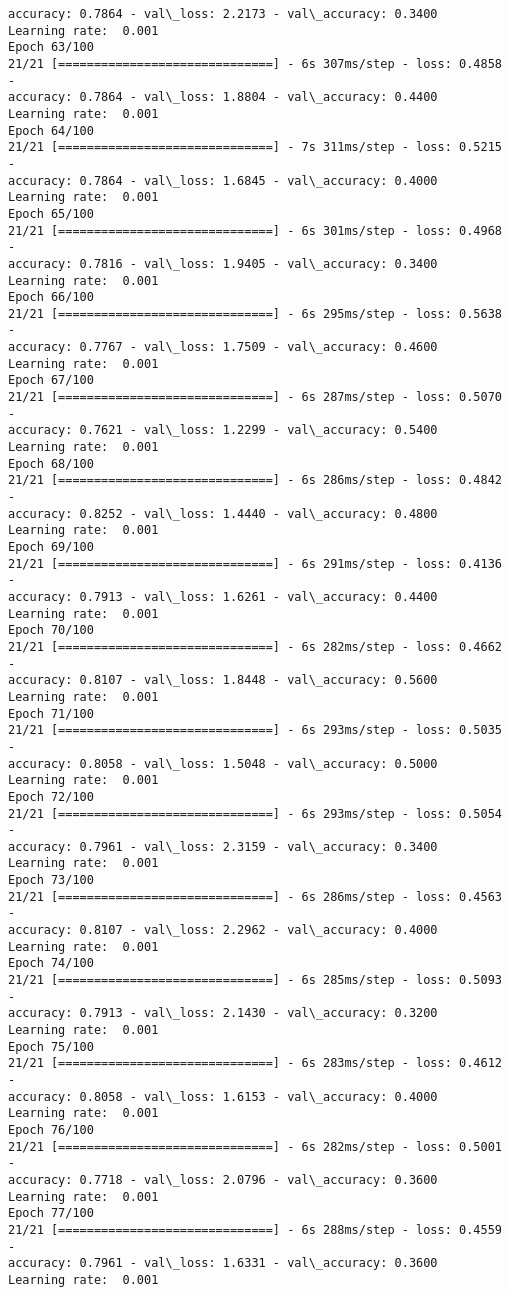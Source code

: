 \documentclass[11pt]{article}
\begin{document}
\begin{Verbatim}[commandchars=\\\{\}]
accuracy: 0.7864 - val\_loss: 2.2173 - val\_accuracy: 0.3400
Learning rate:  0.001
Epoch 63/100
21/21 [==============================] - 6s 307ms/step - loss: 0.4858 -
accuracy: 0.7864 - val\_loss: 1.8804 - val\_accuracy: 0.4400
Learning rate:  0.001
Epoch 64/100
21/21 [==============================] - 7s 311ms/step - loss: 0.5215 -
accuracy: 0.7864 - val\_loss: 1.6845 - val\_accuracy: 0.4000
Learning rate:  0.001
Epoch 65/100
21/21 [==============================] - 6s 301ms/step - loss: 0.4968 -
accuracy: 0.7816 - val\_loss: 1.9405 - val\_accuracy: 0.3400
Learning rate:  0.001
Epoch 66/100
21/21 [==============================] - 6s 295ms/step - loss: 0.5638 -
accuracy: 0.7767 - val\_loss: 1.7509 - val\_accuracy: 0.4600
Learning rate:  0.001
Epoch 67/100
21/21 [==============================] - 6s 287ms/step - loss: 0.5070 -
accuracy: 0.7621 - val\_loss: 1.2299 - val\_accuracy: 0.5400
Learning rate:  0.001
Epoch 68/100
21/21 [==============================] - 6s 286ms/step - loss: 0.4842 -
accuracy: 0.8252 - val\_loss: 1.4440 - val\_accuracy: 0.4800
Learning rate:  0.001
Epoch 69/100
21/21 [==============================] - 6s 291ms/step - loss: 0.4136 -
accuracy: 0.7913 - val\_loss: 1.6261 - val\_accuracy: 0.4400
Learning rate:  0.001
Epoch 70/100
21/21 [==============================] - 6s 282ms/step - loss: 0.4662 -
accuracy: 0.8107 - val\_loss: 1.8448 - val\_accuracy: 0.5600
Learning rate:  0.001
Epoch 71/100
21/21 [==============================] - 6s 293ms/step - loss: 0.5035 -
accuracy: 0.8058 - val\_loss: 1.5048 - val\_accuracy: 0.5000
Learning rate:  0.001
Epoch 72/100
21/21 [==============================] - 6s 293ms/step - loss: 0.5054 -
accuracy: 0.7961 - val\_loss: 2.3159 - val\_accuracy: 0.3400
Learning rate:  0.001
Epoch 73/100
21/21 [==============================] - 6s 286ms/step - loss: 0.4563 -
accuracy: 0.8107 - val\_loss: 2.2962 - val\_accuracy: 0.4000
Learning rate:  0.001
Epoch 74/100
21/21 [==============================] - 6s 285ms/step - loss: 0.5093 -
accuracy: 0.7913 - val\_loss: 2.1430 - val\_accuracy: 0.3200
Learning rate:  0.001
Epoch 75/100
21/21 [==============================] - 6s 283ms/step - loss: 0.4612 -
accuracy: 0.8058 - val\_loss: 1.6153 - val\_accuracy: 0.4000
Learning rate:  0.001
Epoch 76/100
21/21 [==============================] - 6s 282ms/step - loss: 0.5001 -
accuracy: 0.7718 - val\_loss: 2.0796 - val\_accuracy: 0.3600
Learning rate:  0.001
Epoch 77/100
21/21 [==============================] - 6s 288ms/step - loss: 0.4559 -
accuracy: 0.7961 - val\_loss: 1.6331 - val\_accuracy: 0.3600
Learning rate:  0.001

\end{Verbatim}
\end{document}
